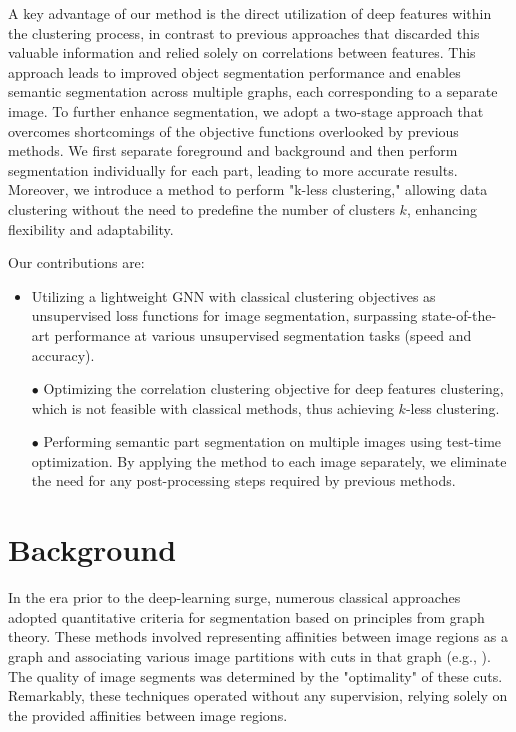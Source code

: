 \documentclass[10pt,twocolumn,letterpaper]{article}
\begin{document}
A key advantage of our method is the direct utilization of deep features within the clustering process, in contrast to previous approaches \cite{melas2022deep, wang2022self} that discarded this valuable information and relied solely on correlations between features. This approach leads to improved object segmentation performance and enables semantic segmentation across multiple graphs, each corresponding to a separate image.
To further enhance segmentation, we adopt a two-stage approach that overcomes shortcomings of the objective functions overlooked by previous methods. We first separate foreground and background and then perform segmentation individually for each part, leading to more accurate results.
Moreover, we introduce a method to perform "k-less clustering," allowing data clustering without the need to predefine the number of clusters $k$, enhancing flexibility and adaptability.

\noindent{}Our contributions are:
\begin{itemize}[leftmargin=*]
\item Utilizing a lightweight GNN with classical clustering objectives as unsupervised loss functions for image segmentation, surpassing state-of-the-art performance at various unsupervised segmentation tasks (speed and accuracy).

\item[$\bullet$] Optimizing the correlation clustering objective for deep features clustering, which is not feasible with classical methods, thus achieving $k$-less clustering.

\item[$\bullet$] Performing semantic part segmentation on multiple images using test-time optimization. By applying the method to each image separately, we eliminate the need for any post-processing steps required by previous methods.
\end{itemize}



\section{Background}
In the era prior to the deep-learning surge, numerous classical approaches adopted quantitative criteria for segmentation based on principles from graph theory. These methods involved representing affinities between image regions as a graph and associating various image partitions with cuts in that graph (e.g., \cite{shi2000normalized, bansal2004correlation, bagon2011large}). The quality of image segments was determined by the "optimality" of these cuts. Remarkably, these techniques operated without any supervision, relying solely on the provided affinities between image regions.
\end{document}
